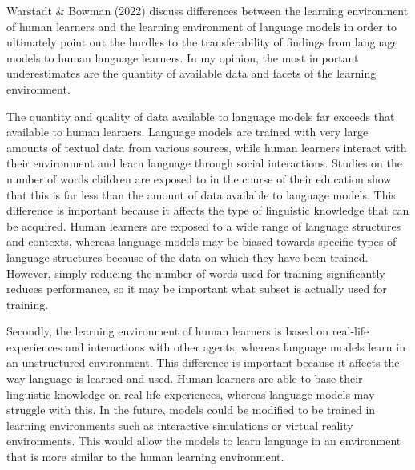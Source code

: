 \documentclass[10pt]{article}
\newenvironment{AnswerBox}{\begin{mdframed}[style=simple]}{\end{mdframed}}
\begin{document}
\begin{AnswerBox}%


  Warstadt \& Bowman (2022) discuss differences between the learning environment of human learners and the learning environment of language models in order to ultimately point out the hurdles to the transferability of findings from language models to human language learners. In my opinion, the most important underestimates are the quantity of available data and facets of the learning environment.

  The quantity and quality of data available to language models far exceeds that available to human learners. Language models are trained with very large amounts of textual data from various sources, while human learners interact with their environment and learn language through social interactions. Studies on the number of words children are exposed to in the course of their education show that this is far less than the amount of data available to language models. This difference is important because it affects the type of linguistic knowledge that can be acquired. Human learners are exposed to a wide range of language structures and contexts, whereas language models may be biased towards specific types of language structures because of the data on which they have been trained. However, simply reducing the number of words used for training significantly reduces performance, so it may be important what subset is actually used for training. 
  
  Secondly, the learning environment of human learners is based on real-life experiences and interactions with other agents, whereas language models learn in an unstructured environment. This difference is important because it affects the way language is learned and used. Human learners are able to base their linguistic knowledge on real-life experiences, whereas language models may struggle with this. In the future, models could be modified to be trained in learning environments such as interactive simulations or virtual reality environments. This would allow the models to learn language in an environment that is more similar to the human learning environment.

\end{AnswerBox}%
\end{document}
